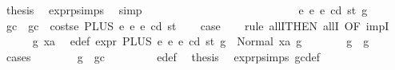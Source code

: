 \begin{isabellebody}
\ {\isacharquery}{\kern0pt}thesis\ \isamarkupfalse%
\ expr{\isachardot}{\kern0pt}psimps{\isacharparenleft}{\kern0pt}{}{}{\isacharparenright}{\kern0pt}\ \isamarkupfalse%
\ simp\isanewline
\ \ \ \ \ \ \ \ \isamarkupfalse%
\isanewline
\ \ \ \ \ \ \isamarkupfalse%
\isanewline
\ \ \ \ \isamarkupfalse%
\isanewline
\ \ \isamarkupfalse%
\isanewline
{}\isamarkupfalse%
\isanewline
\ \ \isamarkupfalse%
\ {\isacharparenleft}{\kern0pt}{}{}\ e{}\ e{}\ e\ cd\ st\ g{\isacharparenright}{\kern0pt}\isanewline
\ \ \isamarkupfalse%
\ gc\ \ {\isachardoublequoteopen}gc\ {\isacharequal}{\kern0pt}\ costs\isactrlsub e\ {\isacharparenleft}{\kern0pt}PLUS\ e{}\ e{}{\isacharparenright}{\kern0pt}\ e\ cd\ st{\isachardoublequoteclose}\isanewline
\ \ \isamarkupfalse%
\ {\isacharquery}{\kern0pt}case\isanewline
\ \ \isamarkupfalse%
\ {\isacharparenleft}{\kern0pt}rule\ allI{\isacharbrackleft}{\kern0pt}THEN\ allI{\isacharcomma}{\kern0pt}\ OF\ impI{\isacharbrackright}{\kern0pt}{\isacharparenright}{\kern0pt}\isanewline
\ \ \ \ \isamarkupfalse%
\ g{}\ xa\ \isamarkupfalse%
\ e{\isacharunderscore}{\kern0pt}def{\isacharcolon}{\kern0pt}\ {\isachardoublequoteopen}expr\ {\isacharparenleft}{\kern0pt}PLUS\ e{}\ e{}{\isacharparenright}{\kern0pt}\ e\ cd\ st\ g\ {\isacharequal}{\kern0pt}\ Normal\ {\isacharparenleft}{\kern0pt}xa{\isacharcomma}{\kern0pt}\ g{}{\isacharparenright}{\kern0pt}{\isachardoublequoteclose}\isanewline
\ \ \ \ \isamarkupfalse%
\ \isamarkupfalse%
\ {\isachardoublequoteopen}g{}\ {\isasymle}\ g{\isachardoublequoteclose}\isanewline
\ \ \ \ \isamarkupfalse%
\ {\isacharparenleft}{\kern0pt}cases{\isacharparenright}{\kern0pt}\isanewline
\ \ \ \ \ \ \isamarkupfalse%
\ {\isachardoublequoteopen}g\ {\isasymle}\ gc{\isachardoublequoteclose}\isanewline
\ \ \ \ \ \ \isamarkupfalse%
\ {}{}{\isacharparenleft}{\kern0pt}{}{\isacharparenright}{\kern0pt}\ e{\isacharunderscore}{\kern0pt}def\ \isamarkupfalse%
\ {\isacharquery}{\kern0pt}thesis\ \isamarkupfalse%
\ expr{\isachardot}{\kern0pt}psimps{\isacharparenleft}{\kern0pt}{}{}{\isacharparenright}{\kern0pt}\ gc{\isacharunderscore}{\kern0pt}def\ \isamarkupfalse%

\end{isabellebody}
